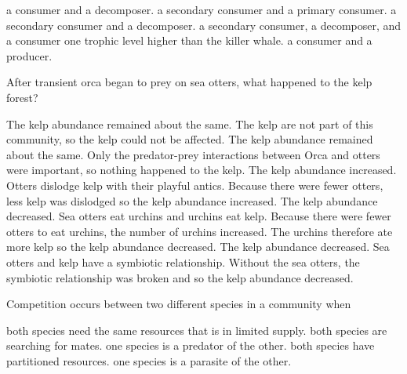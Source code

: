 \begin{choices}
\correctchoice a consumer and a decomposer.%
\choice a secondary consumer and a primary consumer.%
\choice a secondary consumer and a decomposer.%
\choice a secondary consumer, a decomposer, and a consumer one trophic level higher than the killer whale.%
\choice a consumer and a producer.%
\end{choices}

\question
After transient orca began to prey on sea otters, what happened to the kelp forest?

\begin{choices}
\choice The kelp abundance remained about the same. The kelp are not part of this community, so the kelp could not be affected.%
\choice The kelp abundance remained about the same. Only the predator-prey interactions between Orca and otters were important, so nothing happened to the kelp.%
\choice The kelp abundance increased. Otters dislodge kelp with their playful antics.  Because there were fewer otters, less kelp was dislodged so the kelp abundance increased.%
\correctchoice The kelp abundance decreased. Sea otters eat urchins and urchins eat kelp.  Because there were fewer otters to eat urchins, the number of urchins increased.  The urchins therefore ate more kelp so the kelp abundance decreased.%
\choice The kelp abundance decreased. Sea otters and kelp have a symbiotic relationship. Without the sea otters, the symbiotic relationship was broken and so the kelp abundance decreased.%
\end{choices}

\question
Competition occurs between two different species in a community when

\begin{choices}
\correctchoice both species need the same resources that is in limited supply.%
\choice both species are searching for mates.%
\choice one species is a predator of the other.%
\choice both species have partitioned resources.%
\choice one species is a parasite of the other.%
\end{choices}

